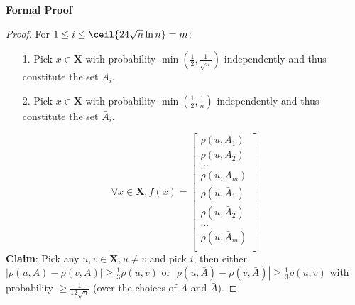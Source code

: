 \textbf{Formal Proof}
\begin{proof}
  For $1 \leq i \leq \ceil{24 \sqrt{n} \ln n} = m$:
  \begin{enumerate}
  \item[1.] Pick $x \in \mathbf{X}$ with probability
    $\min (\frac{1}{2}, \frac{1}{\sqrt{n}})$  independently and thus
    constitute the set $A_i$.\\  
  \item[2.] Pick $x\in \mathbf{X}$ with probability $\min
    (\frac{1}{2}, \frac{1}{n})$ independently and thus constitute the
    set $\bar{A}_i$.
  \end{enumerate}

\[
\forall x \in \mathbf{X}, f(x)=
\begin{bmatrix}
    \rho (u,A_1)\\
    \rho (u,A_2)\\
    ...\\
    \rho (u,A_m)\\
    \rho (u,\bar{A}_1)\\
    \rho (u,\bar{A}_2)\\
    ...\\
    \rho (u,\bar{A}_m)\\
\end{bmatrix}
\]
\textbf{Claim}: Pick any $u,v \in \mathbf{X},u\neq v$ and pick $i$,
then either $|\rho (u,A)-\rho (v,A)| \geq \frac{1}{3} \rho (u,v)$ or
$|\rho (u,\bar{A})-\rho (v,\bar{A})|\geq \frac{1}{3} \rho (u,v)$ with
probability $\geq \frac{1}{12\sqrt{n}}$ (over the choices of $A$ and
$\bar{A}$). 


\end{proof}
